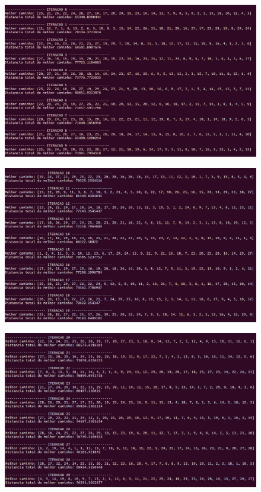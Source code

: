 \documentclass[hidelinks,12pt]{article}
\begin{document}
		\newpage

		\begin{figure}[!h]
			\centering
			\includegraphics[scale=0.4]{Figures/m29-1-1.png}
		\end{figure}

		\newpage

		\begin{figure}[!h]
			\centering
			\includegraphics[scale=0.4]{Figures/m29-2-2.png}
		\end{figure}

		\newpage

		\begin{figure}[!h]
			\centering
			\includegraphics[scale=0.4]{Figures/m29-2-3.png}
		\end{figure}
\end{document}
